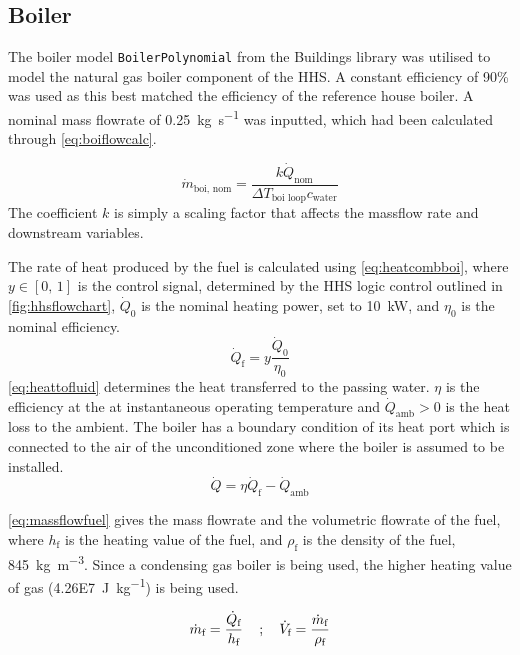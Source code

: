 \subsection{Boiler}
The boiler model \texttt{BoilerPolynomial} from the Buildings library was utilised to model the natural gas boiler component of the \ac{HHS}. A constant efficiency of 90\% was used as this best matched the efficiency of the reference house boiler. A nominal mass flowrate of \qty{0.25}{\kilo\gram\per\second} was inputted, which had been calculated through \cref{eq:boiflowcalc}.

\begin{equation}
    \dot{m}_\text{boi, nom} = \frac{k\dot{Q}_\text{nom}}{\Delta T_\text{boi loop}  c_\text{water}} \label{eq:boiflowcalc}
\end{equation}
The coefficient $k$ is simply a scaling factor that affects the massflow rate and downstream variables.

The rate of heat produced by the fuel is calculated using \cref{eq:heatcombboi}, where $y \in [0\text{, }1]$ is the control signal, determined by the \ac{HHS} logic control outlined in \cref{fig:hhsflowchart}, $\dot{Q}_0$ is the nominal heating power, set to \qty{10}{\kilo\watt}, and $\eta_0$ is the nominal efficiency.
\begin{equation}
    \dot{Q}_\text{f} = y \frac{\dot{Q}_0}{\eta_0}\label{eq:heatcombboi}
\end{equation}
\cref{eq:heattofluid} determines the heat transferred to the passing water. $\eta$ is the efficiency at the at instantaneous operating temperature and $\dot{Q}_\text{amb} > 0 $ is the heat loss to the ambient. The boiler has a boundary condition of its heat port which is connected to the air of the unconditioned zone where the boiler is assumed to be installed.  
\begin{equation}
    \dot{Q} = \eta \dot{Q}_\text{f} - \dot{Q}_\text{amb}\label{eq:heattofluid}
\end{equation}

\cref{eq:massflowfuel} gives the mass flowrate and the volumetric flowrate of the fuel, where $h_\text{f}$ is the heating value of the fuel, and $\rho_\text{f}$ is the density of the fuel, \qty{845}{\kilo\gram\per\cubic\meter}. Since a condensing gas boiler is being used, the higher heating value of gas (\qty{4.26E7}{\joule\per\kilo\gram}) is being used.

 \begin{equation}
    \dot{m}_\text{f} =\frac{\dot{Q}_\text{f}}{h_\text{f}}\label{eq:massflowfuel}\text{\;\;\; ; \;\;\;} \dot{V}_\text{f} =\frac{\dot{m}_\text{f}}{\rho_\text{f}}
 \end{equation}


